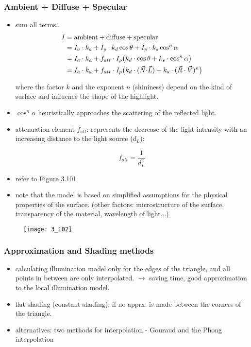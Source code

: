 \documentclass{standalone}
\begin{document}
\subsubsection*{Ambient + Diffuse + Specular}

\begin{itemize}
	\item sum all terms..
	\begin{align}
		I &= \text{ambient} + \text{diffuse} + \text{specular} \\ 
		&= I_a \cdot k_a + I_p \cdot k_d \cos{\theta} + I_p \cdot k_s \cos^n \alpha \\
		&= I_a \cdot k_a + f_{att} \cdot I_p \big(k_d \cdot \cos \theta + k_s \cdot \cos^n \alpha \big) \\
		&= I_a \cdot k_a + f_{att} \cdot I_p \big(k_d \cdot (\vec{N} \bold{\cdot} \vec{L}) + k_s \cdot (\vec{R} \cdot \vec{V})^n \big)
	\end{align}
	
	where the factor $k$ and the exponent $n$ (shininess) depend on the kind of surface and influence the shape of the highlight.
	\item $\cos ^n \alpha$ heuristically approaches the scattering of the reflected light.
	\item attenuation element $f_{att}$: represents the decrease of the light intensity with an increasing distance to the light source ($d_L$): 
	
	\begin{equation}
		f_{att} = \frac{1}{d_L^2}
	\end{equation}
	
	\item refer to Figure 3.101
	\item note that the model is based on simplified assumptions for the physical properties of the surface. (other factors: microstructure of the surface, transparency of the material, wavelength of light...)
\end{itemize}

\begin{figure}[H]
	\texttt{[image: 3\_102]}
\end{figure}


\subsubsection*{Approximation and Shading methods}

\begin{itemize}
	\item calculating illumination model only for the edges of the triangle, and all points in between are only interpolated. $\rightarrow$ saving time, good approximation to the local illumination model.
	\item flat shading (constant shading): if no apprx. is made between the corners of the triangle.
	\item alternatives: two methods for interpolation - Gouraud and the Phong interpolation 
\end{itemize}
\end{document}
